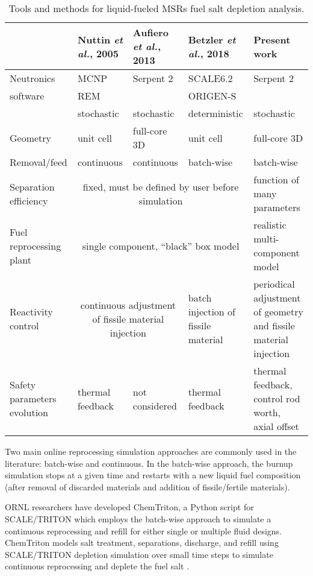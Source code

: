 \begin{table}[htbp]
	\fontsize{9}{11}\selectfont
	\caption{Tools and methods for liquid-fueled \glspl{MSR} fuel salt 	
	depletion analysis.}
	\begin{tabularx}{\textwidth}{p{} p{} 	
	p{} p{} p{}} 
	\hline
	&Nuttin \emph{et al.}, 2005 \cite{nuttin_potential_2005}& Aufiero 
	\emph{et al.}, 2013 \cite{aufiero_extended_2013} & Betzler \emph{et al.}, 
	2018 \cite{betzler_fuel_2018}&Present work \\ \hline
	Neutronics&\gls{MCNP}&Serpent 2 &SCALE6.2     &Serpent 2 \\
	software  & REM      &          &ORIGEN-S     &			       \\
         	  &stochastic&stochastic&deterministic&stochastic      \\[10pt]
	Geometry  & unit cell& full-core 3D&unit cell&full-core 3D\\      [10pt]
	Removal/feed  & continuous &continuous & batch-wise & batch-wise\\[10pt]
	Separation efficiency &\multicolumn{3}{c}{fixed, must be defined by 
	user before simulation} & function of many para\-me\-ters \\ [10pt]
	Fuel reprocessing plant & \multicolumn{3}{c}{single component, 	``black'' 
	box model} & realistic multi-compo\-nent model \\ [10pt]
	Reactivity control & \multicolumn{2}{c}{continuous adjustment of fissile 
	material injection} & batch injection of fissile material & periodical 
		adjustment of geometry and fissile material injection\\ [10pt]
	Safety parameters evolution & thermal feedback & not considered & thermal 
	feedback & thermal feedback, control rod worth, axial offset \\
	\hline
	\end{tabularx}
	\label{tab:msr_codes}
\end{table}

Two main online reprocessing simulation approaches are commonly used in the 
literature: batch-wise and continuous. In the batch-wise approach, the burnup 
simulation stops at a given time and restarts with a new liquid fuel 
composition (after removal of discarded materials and addition of 
fissile/fertile materials). 

\gls{ORNL} researchers have developed ChemTriton, a Python script for
SCALE/TRITON which employs the batch-wise approach to simulate a continuous 
reprocessing and refill for either single or multiple fluid designs.  
ChemTriton models salt treatment, separations, discharge, and refill using  
SCALE/TRITON depletion simulation over small time steps to simulate continuous 
reprocessing and deplete the fuel salt \cite{betzler_fuel_2018, 
powers_new_2013}.

